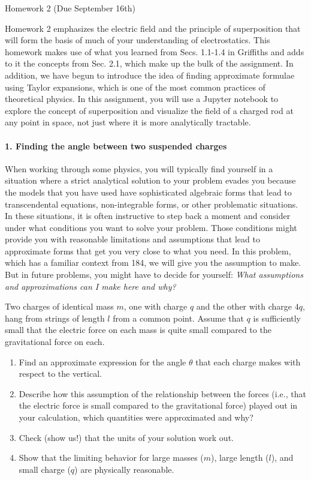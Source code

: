 \documentclass[11pt]{article}
\def\tightlist{}
\begin{document}
{\LARGE Homework 2 (Due September
16th)}\label{homework-2-due-september-16th}

Homework 2 emphasizes the electric field and the principle of
superposition that will form the basis of much of your understanding of
electrostatics. This homework makes use of what you learned from Secs.
1.1-1.4 in Griffiths and adds to it the concepts from Sec. 2.1, which
make up the bulk of the assignment. In addition, we have begun to
introduce the idea of finding approximate formulae using Taylor
expansions, which is one of the most common practices of theoretical
physics. In this assignment, you will use a Jupyter notebook to explore
the concept of superposition and visualize the field of a charged rod at
any point in space, not just where it is more analytically tractable.

\paragraph{1. Finding the angle between two suspended
charges}\label{finding-the-angle-between-two-suspended-charges}

When working through some physics, you will typically find yourself in a
situation where a strict analytical solution to your problem evades you
because the models that you have used have sophisticated algebraic forms
that lead to transcendental equations, non-integrable forms, or other
problematic situations. In these situations, it is often instructive to
step back a moment and consider under what conditions you want to solve
your problem. Those conditions might provide you with reasonable
limitations and assumptions that lead to approximate forms that get you
very close to what you need. In this problem, which has a familiar
context from 184, we will give you the assumption to make. But in future
problems, you might have to decide for yourself: \emph{What assumptions
and approximations can I make here and why?}

Two charges of identical mass \(m\), one with charge \(q\) and the other
with charge \(4q\), hang from strings of length \(l\) from a common
point. Assume that \(q\) is sufficiently small that the electric force
on each mass is quite small compared to the gravitational force on each.

\begin{enumerate}
\def\labelenumi{\arabic{enumi}.}
\tightlist
\item
  Find an approximate expression for the angle \(\theta\) that each
  charge makes with respect to the vertical.
\item
  Describe how this assumption of the relationship between the forces
  (i.e., that the electric force is small compared to the gravitational
  force) played out in your calculation, which quantities were
  approximated and why?
\item
  Check (show us!) that the units of your solution work out.
\item
  Show that the limiting behavior for large masses (\(m\)), large length
  (\(l\)), and small charge (\(q\)) are physically reasonable.
\end{enumerate}
\end{document}
